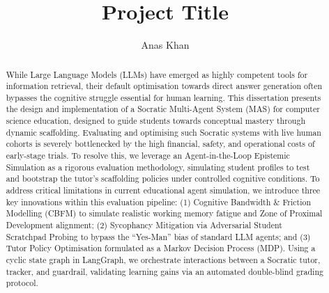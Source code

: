 \documentclass[a4paper, twoside]{report}
\title{Project Title}
\author{Anas Khan}
\begin{document}


\begin{abstract}
While Large Language Models (LLMs) have emerged as highly competent tools for information retrieval, their default optimisation towards direct answer generation often bypasses the cognitive struggle essential for human learning. This dissertation presents the design and implementation of a Socratic Multi-Agent System (MAS) for computer science education, designed to guide students towards conceptual mastery through dynamic scaffolding. Evaluating and optimising such Socratic systems with live human cohorts is severely bottlenecked by the high financial, safety, and operational costs of early-stage trials. To resolve this, we leverage an Agent-in-the-Loop Epistemic Simulation as a rigorous evaluation methodology, simulating student profiles to test and bootstrap the tutor's scaffolding policies under controlled cognitive conditions. To address critical limitations in current educational agent simulation, we introduce three key innovations within this evaluation pipeline: (1) Cognitive Bandwidth \& Friction Modelling (CBFM) to simulate realistic working memory fatigue and Zone of Proximal Development alignment; (2) Sycophancy Mitigation via Adversarial Student Scratchpad Probing to bypass the ``Yes-Man'' bias of standard LLM agents; and (3) Tutor Policy Optimisation formulated as a Markov Decision Process (MDP). Using a cyclic state graph in LangGraph, we orchestrate interactions between a Socratic tutor, tracker, and guardrail, validating learning gains via an automated double-blind grading protocol.

\end{abstract}


\tableofcontents


% 





% 
% 
% 

\renewcommand{\bibname}{References}


\end{document}
